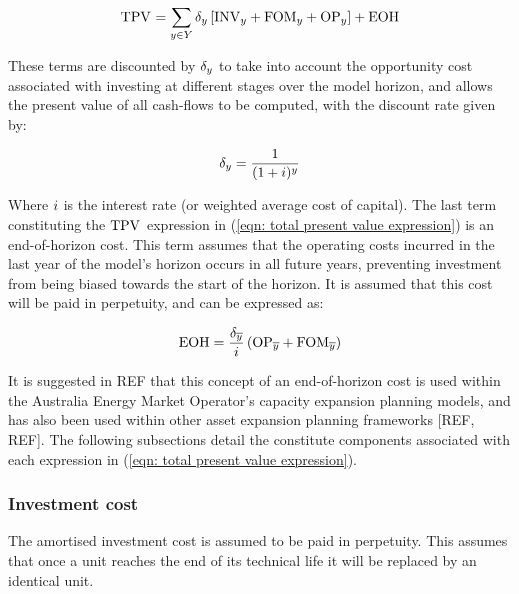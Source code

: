 \documentclass{article}
\begin{document}
\begin{align}
\begin{split}
\cTotalPresentValue & = \sum\limits_{\iYear \in \sYears} \cDiscountRate \left[\cInvestmentCost + \cFixedOperationsMaintenanceCost + \cOperatingCost[\iYear] \right] 
+ \cEndOfHorizonCost \\
\end{split}
\label{eqn: total present value expression}
\end{align}

These terms are discounted by $\cDiscountRate$ to take into account the opportunity cost associated with investing at different stages over the model horizon, and allows the present value of all cash-flows to be computed, with the discount rate given by:

\begin{equation}
\cDiscountRate = \frac{1}{(1 + \cInterestRate)^{\iYear}}
\end{equation}

Where $\cInterestRate$ is the interest rate (or weighted average cost of capital). The last term constituting the $\cTotalPresentValue$ expression in (\ref{eqn: total present value expression}) is an end-of-horizon cost.
This term assumes that the operating costs incurred in the last year of the model's horizon occurs in all future years, preventing investment from being biased towards the start of the horizon. It is assumed that this cost will be paid in perpetuity, and can be expressed as:

\begin{equation}
\cEndOfHorizonCost = \frac{\cDiscountRate[\iYearTerminal]}{\cInterestRate} 
\left(
\cOperatingCost[\iYearTerminal] 
+ 
\cFixedOperationsMaintenanceCost[\iYearTerminal] 
\right)
\end{equation}

It is suggested in REF that this concept of an end-of-horizon cost is used within the Australia Energy Market Operator's capacity expansion planning models, and has also been used within other asset expansion planning frameworks [REF, REF]. The following subsections detail the constitute components associated with each expression in (\ref{eqn: total present value expression}).

\subsubsection{Investment cost}
The amortised investment cost is assumed to be paid in perpetuity. This assumes that once a unit reaches the end of its technical life it will be replaced by an identical unit.
\end{document}
